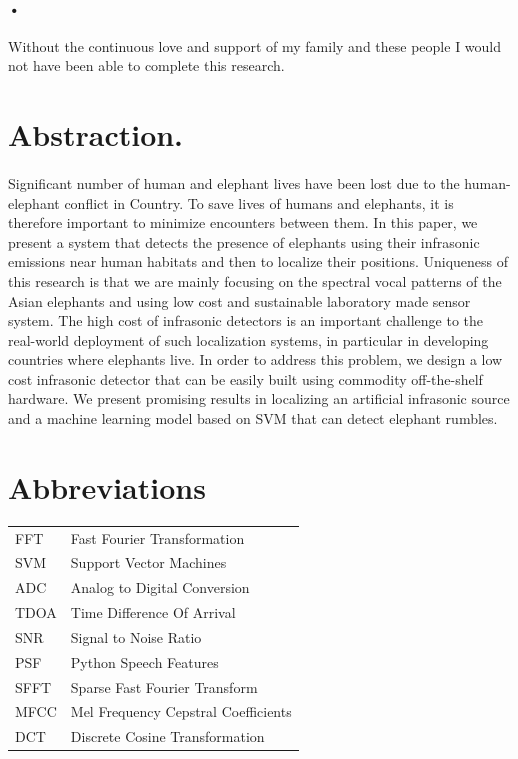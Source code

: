 \documentclass[12pt]{article}
\numberwithin{figure}{section}
\numberwithin{table}{section}
\begin{document}
\paragraph{•}
Without the continuous love and support of my family and these people I would not have been
able to complete this research.

\newpage
\section*{Abstraction.}

\paragraph{}
Significant number of human and elephant lives have
been lost due to the human-elephant conflict in Country. To
save lives of humans and elephants, it is therefore important
to minimize encounters between them. In this paper,
we present a system that detects the presence of elephants
using their infrasonic emissions near human habitats
and then to localize their positions. Uniqueness of this research is that we are mainly focusing on the spectral vocal patterns of the Asian elephants and using low cost and sustainable laboratory made sensor system. The high cost of infrasonic detectors is an important challenge to the real-world
deployment of such localization systems, in particular in developing
countries where elephants live. In order to address
this problem, we design a low cost infrasonic detector that
can be easily built using commodity off-the-shelf hardware.
We present promising results in localizing an artificial infrasonic
source and a machine learning model based on SVM that can detect elephant rumbles.

\newpage
\tableofcontents

\newpage
\listoffigures

\newpage
\section*{Abbreviations}

\begin{tabular}{l l}
FFT & Fast Fourier Transformation\\
SVM & Support Vector Machines \\
ADC & Analog to Digital Conversion \\
TDOA & Time Difference Of Arrival \\
SNR & Signal to Noise Ratio \\
PSF & Python Speech Features \\
SFFT & Sparse Fast Fourier Transform \\
MFCC & Mel Frequency Cepstral Coefficients \\
DCT & Discrete Cosine Transformation \\
\end{tabular}
\end{document}

